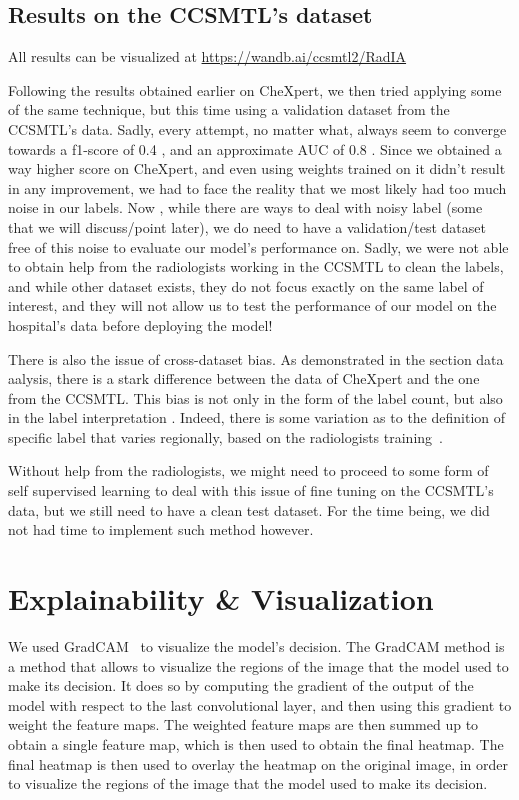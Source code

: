 \documentclass[11pt]{article}
\begin{document}
        \subsection{Results on the CCSMTL's dataset}

            All results can be visualized at \url{https://wandb.ai/ccsmtl2/RadIA}

            Following the results obtained earlier on CheXpert, we then tried applying some of the same technique, but this time using a validation dataset from the CCSMTL's data. Sadly, every attempt, no matter what, always seem
            to converge towards a f1-score of 0.4 , and an approximate AUC of 0.8 . Since we obtained a way higher score on CheXpert, and even using weights trained on it didn't result in any improvement, we had to face
            the reality that we most likely had too much noise in our labels. Now , while there are ways to deal with noisy label (some that we will discuss/point later), we do need to have a validation/test dataset free
            of this noise to evaluate our model's performance on. Sadly, we were not able to obtain help from the radiologists working in the CCSMTL to clean the labels, and while other dataset exists, they do not focus
            exactly on the same label of interest, and they will not allow us to test the performance of our model on the hospital's data before deploying the model!

            There is also the issue of cross-dataset bias. As demonstrated in the section data aalysis, there is a stark difference between the data of CheXpert and the one from the CCSMTL. This bias is not only in the form of the
            label count, but also in the label interpretation . Indeed, there is some variation as to the definition of specific label that varies regionally, based on the radiologists training~\cite{cross-bias}.

            Without help from the radiologists, we might need to proceed to some form of self supervised learning to deal with this issue of fine tuning on the CCSMTL's data, but we still need to have a clean test dataset. For the time being, we did not had time to implement such method however.



    \section{Explainability \& Visualization}

        We used GradCAM~\cite{gradcam} to visualize the model's decision. The GradCAM method is a method that allows to visualize the regions of the image that the model used to make its decision. It does so by computing the gradient of the output of the model with respect to the last convolutional layer, and then using this gradient to weight the feature maps.
        The weighted feature maps are then summed up to obtain a single feature map, which is then used to obtain the final heatmap.
        The final heatmap is then used to overlay the heatmap on the original image, in order to visualize the regions of the image that the model used to make its decision.
\end{document}

